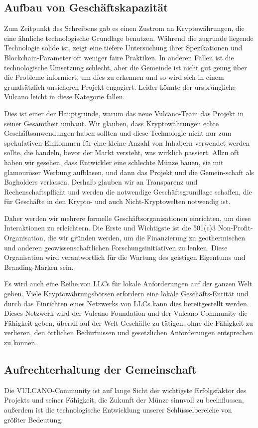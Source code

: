 \documentclass[A4paper, 12pt]{article}
\begin{document}
\subsection{Aufbau von Geschäftskapazität}
Zum Zeitpunkt des Schreibens gab es einen Zustrom an Kryptowährungen, die eine ähnliche technologische Grundlage benutzen. Während die zugrunde liegende Technologie solide ist, zeigt eine tiefere Untersuchung ihrer Spezikationen und Blockchain-Parameter oft weniger faire Praktiken. In anderen Fällen ist die technologische Umsetzung schlecht, aber die Gemeinde ist nicht gut genug über die Probleme informiert, um dies zu erkennen und so wird sich in einem grundsätzlich unsicheren Projekt engagiert. Leider könnte der ursprüngliche Vulcano leicht in diese Kategorie fallen. 

Dies ist einer der Hauptgründe, warum das neue Vulcano-Team das Projekt in seiner Gesamtheit umbaut. Wir glauben, dass Kryptowährungen echte Geschäftsanwendungen haben sollten und diese Technologie nicht nur zum spekulativen Einkommen  für eine kleine Anzahl von Inhabern verwendet werden sollte, die handeln, bevor der Markt versteht, was wirklich passiert. Allzu oft haben wir gesehen, dass Entwickler eine schlechte Münze bauen, sie mit glamouröser Werbung aufblasen, und dann das Projekt und die Gemein-schaft als Bagholders verlassen. Deshalb glauben wir an Transparenz und Rechenschaftspflicht und werden die notwendige Geschäftsgrundlage schaffen, die für Geschäfte in den Krypto- und auch Nicht-Kryptowelten notwendig ist. 

Daher werden wir mehrere formelle Geschäftsorganisationen einrichten, um diese Interaktionen zu erleichtern. Die Erste und Wichtigste ist die 501(c)3 Non-Profit-Organisation, die wir gründen werden, um die Finanzierung zu geothermischen und anderen geowissenschaftlichen Forschungsinitiativen zu lenken. Diese Organisation wird verantwortlich für die Wartung des geistigen Eigentums und Branding-Marken sein. 

Es wird auch eine Reihe von LLCs für lokale Anforderungen auf der ganzen Welt geben. Viele Kryptowährungsbörsen erfordern eine lokale Geschäfts-Entität und durch das Einrichten eines Netzwerks von LLCs kann dies bereitgestellt werden. Dieses Netzwerk wird der Vulcano Foundation und der Vulcano Community die Fähigkeit geben, überall auf der Welt Geschäfte zu tätigen, ohne die Fähigkeit zu verlieren, den örtlichen Bedürfnissen und gesetzlichen Anforderungen entsprechen zu können. 

\subsection{Aufrechterhaltung der Gemeinschaft}
Die VULCANO-Community ist auf lange Sicht der wichtigste Erfolgsfaktor des Projekts und seiner Fähigkeit, die Zukunft der Münze sinnvoll zu beeinflussen, außerdem ist die technologische Entwicklung unserer Schlüsselbereiche von größter Bedeutung. 
\end{document}
